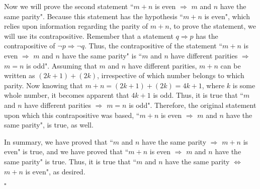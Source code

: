 \documentclass[12pt]{exam}
\begin{document}
\begin{questions}
\par
Now we will prove the second statement ``$m+n$ is even $\Rightarrow$ $m$ and $n$ have the same parity". Because this statement has the hypothesis ``$m+n$ is even", which relies upon information regarding the parity of $m+n$, to prove the statement, we will use its contrapositive. Remember that a statement $q\Rightarrow p$ has the contrapositive of $\neg p \Rightarrow \neg q$. Thus, the contrapositive of the statement ``$m+n$ is even $\Rightarrow$ $m$ and $n$ have the same parity" is ``$m$ and $n$ have different parities $\Rightarrow$ $m=n$ is odd". Assuming that $m$ and $n$ have different parities, $m+n$ can be written as $(2k+1)+(2k)$, irrespective of which number belongs to which parity. Now knowing that $m+n=(2k+1)+(2k)=4k+1$, where $k$ is some whole number, it becomes apparent that $4k+1$ is odd. Thus, it is true that ``$m$ and $n$ have different parities $\Rightarrow$ $m=n$ is odd". Therefore, the original statement upon which this contrapositive was based, ``$m+n$ is even $\Rightarrow$ $m$ and $n$ have the same parity", is true, as well.
\par
In summary, we have proved that ``$m$ and $n$ have the same parity $\Rightarrow$  $m+n$ is even" is true, and we have proved that ``$m+n$ is even $\Rightarrow$ $m$ and $n$ have the same parity" is true. Thus, it is true that ``$m$ and $n$ have the same parity $\Leftrightarrow$  $m+n$ is even", as desired.
\begin{flushright}
$\square$
\end{flushright}


\end{questions}
\end{document}
